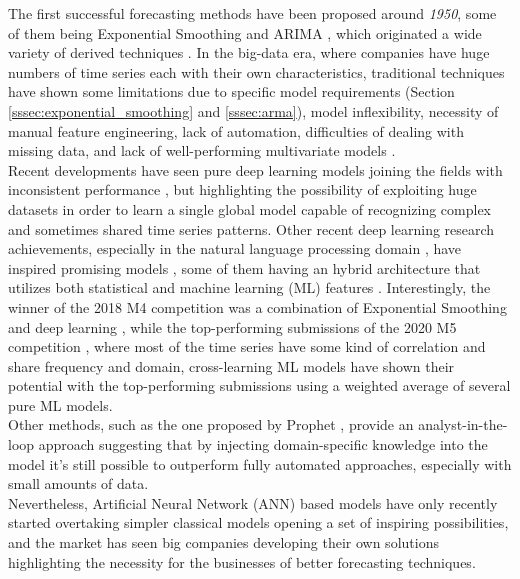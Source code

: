\documentclass[a4paper, 12pt]{article} %
\begin{document}
	The first successful forecasting methods have been proposed around \textit{1950}, some of them being Exponential Smoothing \cite{ExponentialSmoothingHoltCharles} and ARIMA \cite{ForecastingBoxJenkins}, which originated a wide variety of derived techniques \cite{25YearsForecasting}. In the big-data era, where companies have huge numbers of time series each with their own characteristics, traditional techniques have shown some limitations due to specific model requirements (Section \ref{sssec:exponential_smoothing} and \ref{sssec:arma}), model inflexibility, necessity of manual feature engineering, lack of automation, difficulties of dealing with missing data, and lack of well-performing multivariate models \cite{25YearsForecasting}.\\
	Recent developments have seen pure deep learning models joining the fields with inconsistent performance \cite{DeepLearningForecastingSurvey}, but highlighting the possibility of exploiting huge datasets in order to learn a single global model capable of recognizing complex and sometimes shared time series patterns. Other recent deep learning research achievements, especially in the natural language processing domain \cite{RNNLSTM, seq2seq, EncoderDecoder}, have inspired promising models \cite{DeepAR, DeepState, DeepLearningForecastingSurvey}, some of them having an hybrid architecture that utilizes both statistical and machine learning (ML) features \cite{MAKRIDAKIS2018802, GluonTS}. 
	Interestingly, the winner of the 2018 M4 competition \cite{MAKRIDAKIS2018802} was a combination of Exponential Smoothing and deep learning \cite{UberHybridES}, while the top-performing submissions of the 2020 M5 competition \cite{M5Competition}, where most of the time series have some kind of correlation and share frequency and domain, cross-learning ML models have shown their potential with the top-performing submissions using a weighted average of several pure ML models.\\
	Other methods, such as the one proposed by Prophet \cite{FacebookProphet}, provide an analyst-in-the-loop approach suggesting that by injecting domain-specific knowledge into the model it's still possible to outperform fully automated approaches, especially with small amounts of data.\\
	Nevertheless, Artificial Neural Network (ANN) based models have only recently started overtaking simpler classical models \cite{MAKRIDAKIS2018802, M5Competition} opening a set of inspiring possibilities, and the market has seen big companies developing their own solutions \cite{FacebookProphet, GluonTS, MicrosoftSSA, UberHybridES} highlighting the necessity for the businesses of better forecasting techniques.
	
\end{document}
